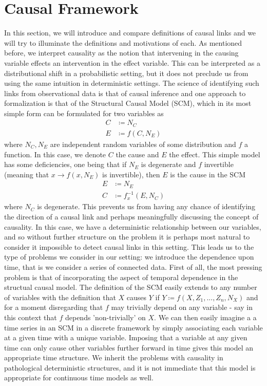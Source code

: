 \documentclass[11pt, a4paper]{memoir}
\theoremstyle{plain}
\theoremstyle{definition}
\begin{document}
\section{Causal Framework}
In this section, we will introduce and compare definitions of causal links and we will try to illuminate the definitions and motivations of each. As mentioned before, we interpret causality as the notion that intervening in the causing variable effects an intervention in the effect variable. This can be interpreted as a distributional shift in a probabilistic setting, but it does not preclude us from using the same intuition in deterministic settings. The science of identifying such links from observational data is that of causal inference and one approach to formalization is that of the Structural Causal Model (SCM), which in its most simple form can be formulated for two variables as
\begin{align*}
C&\coloneqq N_C\\
E&\coloneqq f(C,N_E)
\end{align*}
where $N_C,N_E$ are independent random variables of some distribution and $f$ a function. In this case, we denote $C$ the cause and $E$ the effect. This simple model has some deficiencies, one being that if $N_E$ is degenerate and $f$ invertible (meaning that $x\to f(x,N_E)$ is invertible), then $E$ is the cause in the SCM
\begin{align*}
E&\coloneqq N_E\\
C&\coloneqq f_x^{-1}(E,N_C)
\end{align*}
where $N_C$ is degenerate. This prevents us from having any chance of identifying the direction of a causal link and perhaps meaningfully discussing the concept of causality. In this case, we have a deterministic relationship between our variables, and so without further structure on the problem it is perhaps most natural to consider it impossible to detect causal links in this setting. This leads us to the type of problems we consider in our setting: we introduce the dependence upon time, that is we consider a series of connected data. First of all, the most pressing problem is that of incorporating the aspect of temporal dependence in the structual causal model. The definition of the SCM easily extends to any number of variables with the definition that $X$ causes $Y$ if $Y\coloneqq f(X,Z_1,...,Z_n,N_X)$ and for a moment disregarding that $f$ may trivially depend on any variable - say in this context that $f$ depends 'non-trivially' on $X$. We can then easily imagine a a time series in an SCM in a discrete framework by simply associating each variable at a given time with a unique variable. Imposing that a variable at any given time can only cause other variables further forward in time gives this model an appropriate time structure. We inherit the problems with causality in pathological deterministic structures, and it is not immediate that this model is appropriate for continuous time models as well.\\\\
\end{document}
